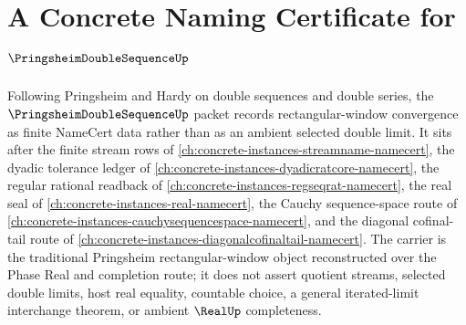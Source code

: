 \chapter{A Concrete Naming Certificate for $\PringsheimDoubleSequenceUp$}
\label{ch:concrete-instances-pringsheim-double-sequence-namecert}

Following Pringsheim and Hardy on double sequences and double series, the $\PringsheimDoubleSequenceUp$ packet records rectangular-window convergence as finite NameCert data rather than as an ambient selected double limit. It sits after the finite stream rows of \autoref{ch:concrete-instances-streamname-namecert}, the dyadic tolerance ledger of \autoref{ch:concrete-instances-dyadicratcore-namecert}, the regular rational readback of \autoref{ch:concrete-instances-regseqrat-namecert}, the real seal of \autoref{ch:concrete-instances-real-namecert}, the Cauchy sequence-space route of \autoref{ch:concrete-instances-cauchysequencespace-namecert}, and the diagonal cofinal-tail route of \autoref{ch:concrete-instances-diagonalcofinaltail-namecert}. The carrier is the traditional Pringsheim rectangular-window object reconstructed over the Phase Real and completion route; it does not assert quotient streams, selected double limits, host real equality, countable choice, a general iterated-limit interchange theorem, or ambient $\RealUp$ completeness.

